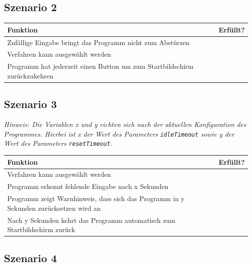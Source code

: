 \documentclass{article}
\newcommand{\cmark}{\ding{51}}
\begin{document}
  \subsection{Szenario 2}
    \begin{table}[H]
      \begin{tabularx}{\textwidth}{| >{\raggedright\arraybackslash}X | c |}
        \hline
        \textbf{Funktion} & \textbf{Erfüllt?} \\
        \hline
        Zufällige Eingabe bringt das Programm nicht zum Abstürzen & \cmark \\
        \hline
        Verfahren kann ausgewählt werden & \cmark \\
        \hline
        Programm hat jederzeit einen Button um zum Startbildschirm zurückzukehren & \cmark \\
        \hline
      \end{tabularx}
    \end{table}

  \subsection{Szenario 3}
    \textit{Hinweis: Die Variablen x und y richten sich nach der aktuellen Konfiguration des Programmes. Hierbei
      ist x der Wert des Parameters \texttt{idleTimeout} sowie y der Wert des Parameters \texttt{resetTimeout}.}
    \newline

    \begin{table}[H]
      \begin{tabularx}{\textwidth}{| >{\raggedright\arraybackslash}X | c |}
        \hline
        \textbf{Funktion} & \textbf{Erfüllt?} \\
        \hline
        Verfahren kann ausgewählt werden & \cmark \\
        \hline
        Programm erkennt fehlende Eingabe nach x Sekunden & \cmark \\
        \hline
        Programm zeigt Warnhinweis, dass sich das Programm in y Sekunden zurücksetzen wird an & \cmark \\
        \hline
        Nach y Sekunden kehrt das Programm automatisch zum Startbildschirm zurück & \cmark \\
        \hline
      \end{tabularx}
    \end{table}

  \subsection{Szenario 4}
\end{document}
